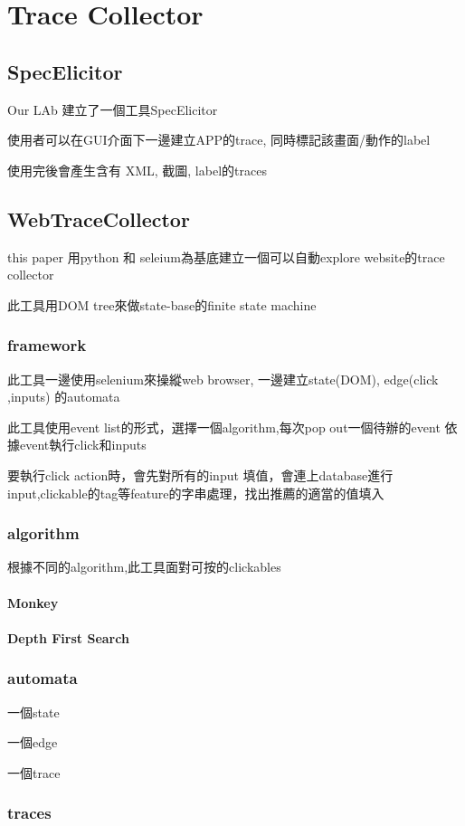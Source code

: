 
\chapter{Trace Collector}\label{ch:traceCollector}

\section{SpecElicitor}

Our LAb 建立了一個工具SpecElicitor

使用者可以在GUI介面下一邊建立APP的trace, 同時標記該畫面/動作的label

使用完後會產生含有 XML, 截圖, label的traces

\section{WebTraceCollector}

this paper 用python 和 seleium為基底建立一個可以自動explore website的trace collector

此工具用DOM tree來做state-base的finite state machine

\subsection{framework}

此工具一邊使用selenium來操縱web browser,
一邊建立state(DOM), edge(click ,inputs) 的automata

此工具使用event list的形式，選擇一個algorithm,每次pop out一個待辦的event
依據event執行click和inputs

要執行click action時，會先對所有的input 填值，會連上database進行input,clickable的tag等feature的字串處理，找出推薦的適當的值填入


\subsection{algorithm}

根據不同的algorithm,此工具面對可按的clickables

\subsubsection{Monkey}



\subsubsection{Depth First Search}

\subsection{automata}

一個state

一個edge

一個trace

\subsection{traces}